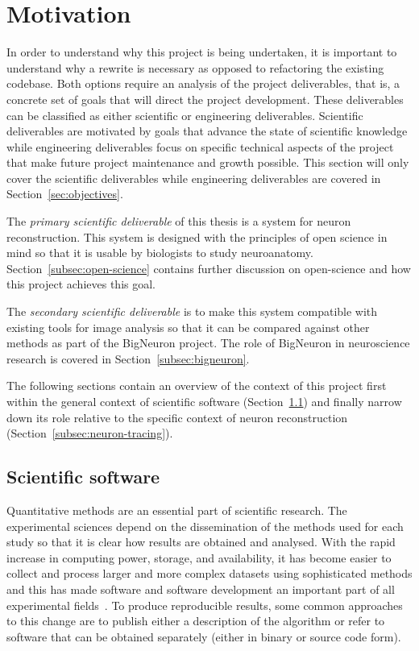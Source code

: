 \section{Motivation}\label{sec:motivation}

In order to understand why this project is being undertaken, it is
important to understand why a rewrite is necessary as opposed to refactoring
the existing codebase. Both options require an analysis of the project
deliverables, that is, a concrete set of goals that will direct the project
development. These deliverables can be classified as either scientific or
engineering deliverables. Scientific deliverables are motivated by goals that
advance the state of scientific knowledge while engineering deliverables focus
on specific technical aspects of the project that make future project
maintenance and growth possible. This section will only cover the scientific
deliverables while engineering deliverables are covered in Section~\ref{sec:objectives}.

The \emph{primary scientific deliverable} of this thesis is a system for
neuron reconstruction. This system is designed with the principles of open
science in mind so that it is usable by biologists to study
neuroanatomy. Section~\ref{subsec:open-science} contains further
discussion on open-science and how this project achieves this
goal.

The \emph{secondary scientific deliverable} is to make this system
compatible with existing tools for image analysis so that it can
be compared against other methods as part of the BigNeuron
project. The role of BigNeuron in neuroscience research is covered
in Section~\ref{subsec:bigneuron}.

The following sections contain an overview of the context of this project
first within the general context of scientific software (Section~\ref{subsec:sci-soft})
and finally narrow down its role relative to the specific context
of neuron reconstruction (Section~\ref{subsec:neuron-tracing}).

\subsection{Scientific software}\label{subsec:sci-soft}
{ %
	Quantitative methods are an essential part of scientific research. The
	experimental sciences depend on the dissemination of the methods used for each
	study so that it is clear how results are obtained and analysed.
	With the rapid increase in computing power, storage, and availability,
	it has become easier to collect and process larger and more complex datasets
	using sophisticated methods and this has made software and
	software development an important part of all experimental
	fields~\autocite{Baxter2006,SSI:hettrick_2014_14809}.
	To produce reproducible results, some common approaches to this change are
	to publish either a description of the algorithm or refer to software
	that can be obtained separately (either in binary or source code form).
}

